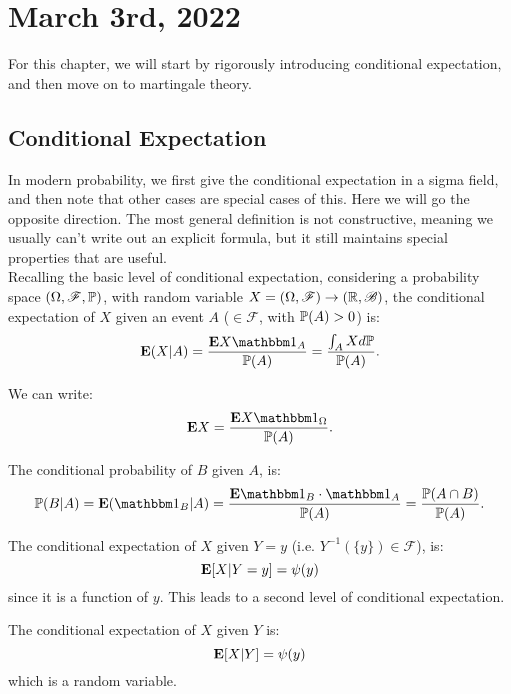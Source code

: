 \documentclass[../main/main.tex]{subfiles}
\begin{document}
\section{March 3rd, 2022}
For this chapter, we will start by rigorously introducing conditional expectation, and then move on to martingale theory.
\subsection{Conditional Expectation}
In modern probability, we first give the conditional expectation in a sigma field, and then note that other cases are special cases of this. Here we will go the opposite direction. The most general definition is not constructive, meaning we usually can't write out an explicit formula, but it still maintains special properties that are useful.\\

Recalling the basic level of conditional expectation, considering a probability space $(\Omega, \mathscr{F}, \P)$, with random variable $X = (\Omega, \mathscr{F}) \to (\R , \mathscr{B})$, the conditional expectation of $X$ given an event $A$ ($\in \mathscr{F}$, with $\P(A) > 0$) is: \[
	\E(X | A) = \frac{\E X \ind_A}{\P(A)} = \frac{\int_{A} X d \P}{\P(A)}.
\]
\begin{remark}
	We can write: \[
		\E X =  \frac{\E X \ind_{\Omega}}{\P(A)}.
	\]
\end{remark}
\begin{example}
	The conditional probability of $B$ given $A$, is: \[
		\P(B | A)= \E(\ind_B | A)  = \frac{\E \ind_B \cdot \ind_A}{\P(A)} = \frac{\P(A \cap B)}{\P(A)}.
	\]
\end{example}
\begin{example}
	The conditional expectation of $X$ given $Y=y$ (i.e. $Y^{-1}(\{y\}) \in \mathscr{F}$), is: \[
		\E[X | Y = y] = \psi(y)
	\] since it is a function of $y$. This leads to a second level of conditional expectation.
\end{example}

The conditional expectation of $X$ given $Y$ is: \[
	\E[X | Y] = \psi (y)
\] which is a random variable.
\end{document}
